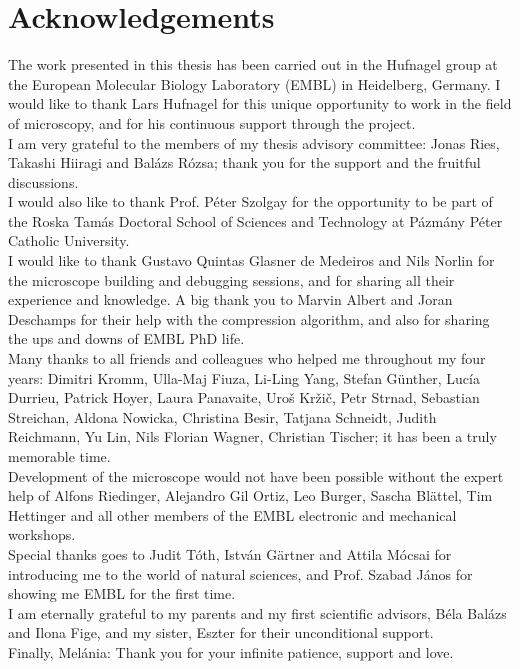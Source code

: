 
\cleardoublepage
\chapter*{Acknowledgements}

The work presented in this thesis has been carried out in the Hufnagel group at the European Molecular Biology Laboratory (EMBL) in Heidelberg, Germany. I would like to thank Lars Hufnagel for this unique opportunity to work in the field of microscopy, and for his continuous support through the project.
\\[1ex]
I am very grateful to the members of my thesis advisory committee: Jonas Ries, Takashi Hiiragi and Balázs Rózsa; thank you for the support and the fruitful discussions.
\\[1ex]
I would also like to thank Prof. Péter Szolgay for the opportunity to be part of the Roska Tamás Doctoral School of Sciences and Technology at Pázmány Péter Catholic University.
\\[1ex]
I would like to thank Gustavo Quintas Glasner de Medeiros and Nils Norlin for the microscope building and debugging sessions, and for sharing all their experience and knowledge.
A big thank you to Marvin Albert and Joran Deschamps for their help with the compression algorithm, and also for sharing the ups and downs of EMBL PhD life.
\\[1ex]
Many thanks to all friends and colleagues who helped me throughout my four years: 
Dimitri Kromm,
Ulla-Maj Fiuza,
Li-Ling Yang,
Stefan Günther,
Lucía Durrieu,
Patrick Hoyer,
Laura Panavaite,
Uroš Kržič,
Petr Strnad,
Sebastian Streichan,
Aldona Nowicka,
Christina Besir,
Tatjana Schneidt,
Judith Reichmann,
Yu Lin,
Nils Florian Wagner,
Christian Tischer;
it has been a truly memorable time.
\\[1ex]
Development of the microscope would not have been possible without the expert help of Alfons Riedinger, Alejandro Gil Ortiz, Leo Burger, Sascha Blättel, Tim Hettinger and all other members of the EMBL electronic and mechanical workshops.
\\[1ex]
Special thanks goes to Judit Tóth, István Gärtner and Attila Mócsai for introducing me to the world of natural sciences, and Prof. Szabad János for showing me EMBL for the first time.
\\[1ex]
I am eternally grateful to my parents and my first scientific advisors, Béla Balázs and Ilona Fige, and my sister, Eszter for their unconditional support.
\\[1em]
Finally, Melánia: Thank you for your infinite patience, support and love.